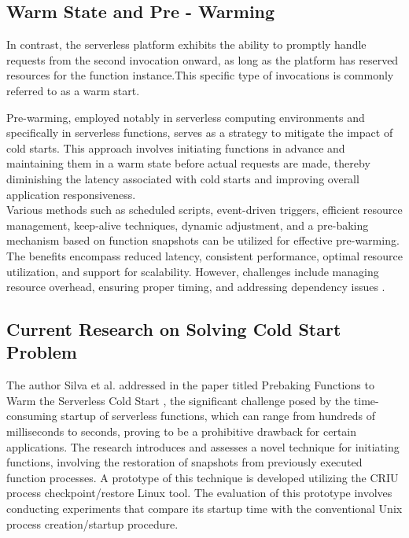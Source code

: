 \subsection{Warm State and Pre - Warming}

In contrast, the serverless platform exhibits the ability to promptly handle requests from the second invocation onward, as long as the platform has reserved resources for the function instance.This specific type of invocations is commonly referred to as a warm start\cite{LYYO21}.

Pre-warming, employed notably in serverless computing environments and specifically in serverless functions, serves as a strategy to mitigate the impact of cold starts. This approach involves initiating functions in advance and maintaining them in a warm state before actual requests are made, thereby diminishing the latency associated with cold starts and improving overall application responsiveness.\\

Various methods such as scheduled scripts, event-driven triggers, efficient resource management, keep-alive techniques, dynamic adjustment, and a pre-baking mechanism based on function snapshots \cite{SFP20} can be utilized for effective pre-warming. The benefits encompass reduced latency, consistent performance, optimal resource utilization, and support for scalability. However, challenges include managing resource overhead, ensuring proper timing, and addressing dependency issues \cite{FS21, MEHW18}.


\subsection{Current Research on Solving Cold Start Problem}


The author Silva et al. addressed in the paper titled Prebaking Functions to Warm the Serverless Cold Start \cite{SFP20}, the significant challenge posed by the time-consuming startup of serverless functions, which can range from hundreds of milliseconds to seconds, proving to be a prohibitive drawback for certain applications. The research introduces and assesses a novel technique for initiating functions, involving the restoration of snapshots from previously executed function processes. A prototype of this technique is developed utilizing the CRIU process checkpoint/restore Linux tool. The evaluation of this prototype involves conducting experiments that compare its startup time with the conventional Unix process creation/startup procedure.\\

